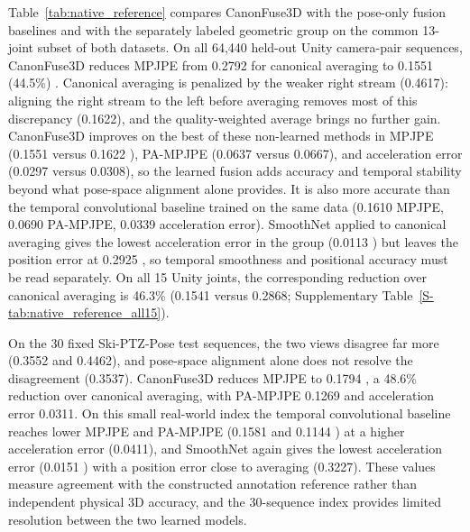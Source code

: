 \documentclass[preprint,12pt]{elsarticle}
\providecommand{\DIFaddbegin}{} %
\providecommand{\DIFaddend}{} %
\providecommand{\DIFadd}[1]{{\protect\color{blue}#1}} %
\begin{document}
 Table~\ref{tab:native_reference}  \DIFaddbegin \DIFadd{compares CanonFuse3D with the pose-only fusion baselines and with the separately labeled geometric group on the }\DIFaddend common 13-joint subset  \DIFaddbegin \DIFadd{of both datasets. On all 64,440 held-out Unity camera-pair sequences, }\DIFaddend CanonFuse3D reduces  MPJPE from 0.2792 for canonical averaging to 0.1551 (44.5\%) \DIFaddbegin \DIFadd{. Canonical averaging is penalized by the weaker right stream (0.4617): aligning the right stream to the left before averaging removes most of this discrepancy (0.1622), and the quality-weighted average brings no further gain. CanonFuse3D improves on the best of these non-learned methods in MPJPE (0.1551 }\DIFaddend versus  0.1622 \DIFaddbegin \DIFadd{), PA-MPJPE (0.0637 versus 0.0667), and acceleration error (0.0297 versus 0.0308), so the learned fusion adds accuracy and temporal stability beyond what pose-space alignment alone provides. It is also more accurate than the temporal convolutional baseline trained on the same data (}\DIFaddend 0.1610  \DIFaddbegin \DIFadd{MPJPE, 0.0690 PA-MPJPE, 0.0339 acceleration error). SmoothNet applied to canonical averaging gives }\DIFaddend the lowest acceleration error in the  \DIFaddbegin \DIFadd{group (}\DIFaddend 0.0113 \DIFaddbegin \DIFadd{) but leaves the position error at }\DIFaddend 0.2925 \DIFaddbegin \DIFadd{, so temporal smoothness and positional accuracy must be read separately. On all 15 Unity joints, the corresponding reduction over canonical averaging is 46.3\% (0.1541 }\DIFaddend versus  \DIFaddbegin \DIFadd{0.2868; Supplementary Table~\ref{S-tab:native_reference_all15}).
}\DIFaddend 

 \DIFaddbegin \DIFadd{On the }\DIFaddend 30 fixed Ski-PTZ-Pose test  \DIFaddbegin \DIFadd{sequences, the two views disagree far more (0.3552 and 0.4462), and pose-space alignment alone does not resolve the disagreement (0.3537)}\DIFaddend . CanonFuse3D reduces  \DIFaddbegin \DIFadd{MPJPE }\DIFaddend to 0.1794 \DIFaddbegin \DIFadd{, a }\DIFaddend 48.6\%  \DIFaddbegin \DIFadd{reduction over canonical averaging, with PA-MPJPE 0.1269 and acceleration error }\DIFaddend 0.0311.  \DIFaddbegin \DIFadd{On this small real-world index the temporal convolutional baseline reaches lower MPJPE and }\DIFaddend PA-MPJPE  \DIFaddbegin \DIFadd{(0.1581 }\DIFaddend and 0.1144 \DIFaddbegin \DIFadd{) at a higher acceleration error (0.0411), and SmoothNet again gives the lowest acceleration error (}\DIFaddend 0.0151 \DIFaddbegin \DIFadd{) with a position error close to averaging (0.3227). }\DIFaddend These values measure agreement with the  \DIFaddbegin \DIFadd{constructed annotation reference rather than }\DIFaddend independent physical 3D accuracy\DIFaddbegin \DIFadd{, and the 30-sequence index provides limited resolution between the two learned models}\DIFaddend .
\end{document}

